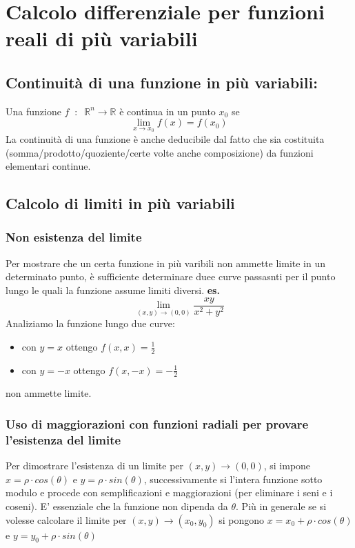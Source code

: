 \section*{Calcolo differenziale per funzioni reali di più variabili}
\subsection*{Continuità di una funzione in più variabili:}
Una funzione $f \;\;:\;\; \mathbb{R}^n \rightarrow  \mathbb{R}$ è continua in un punto $x_0$ se 
\[
    \lim_{x\rightarrow x_0} f(x) = f(x_0)
\]
La continuità di una funzione è anche deducibile dal fatto che sia costituita (somma/prodotto/quoziente/certe volte anche composizione) da funzioni elementari continue.\newline
\subsection*{Calcolo di limiti in più variabili}
\subsubsection*{Non esistenza del limite}
Per mostrare che un certa funzione in più varibili non ammette limite in un determinato punto, è sufficiente determinare duee curve passasnti per il punto lungo le quali la funzione assume limiti diversi.
\textbf{es.} 
\[
    \lim_{(x,y)\rightarrow (0,0)} \frac{xy}{x^2+y^2}
\]
Analiziamo la funzione lungo due curve:
\begin{itemize}
    \item con $y=x$ ottengo $f(x,x) = \frac{1}{2}$
    \item con $y=-x$ ottengo $f(x,-x) = - \frac{1}{2}$
\end{itemize}
non ammette limite.\newline
\subsubsection*{Uso di maggiorazioni con funzioni radiali per provare l'esistenza del limite}
Per dimostrare l'esistenza di un limite per $(x,y) \rightarrow (0,0)$, si impone $x=\rho \cdot  cos(\theta)$ e $y= \rho \cdot sin(\theta)$, successivamente si l'intera funzione sotto modulo e procede con semplificazioni e maggiorazioni (per eliminare i seni e i coseni). E' essenziale che la funzione non dipenda da $\theta$.\newline
Più in generale se si volesse calcolare il limite per $(x,y) \rightarrow (x_0, y_0)$ si pongono $x=x_0 +\rho \cdot  cos(\theta)$ e $y= y_0 + \rho \cdot sin(\theta)$
